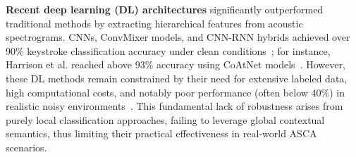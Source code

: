 \textbf{Recent deep learning (DL) architectures} significantly outperformed traditional methods by extracting hierarchical features from acoustic spectrograms. CNNs, ConvMixer models, and CNN-RNN hybrids achieved over 90\% keystroke classification accuracy under clean conditions~\cite{harrison2023practical, akinbi2023password, giallanza2019keyboard, toreini2015acoustic}; for instance, Harrison et al. reached above 93\% accuracy using CoAtNet models~\cite{harrison2023practical}. However, these DL methods remain constrained by their need for extensive labeled data, high computational costs, and notably poor performance (often below 40\%) in realistic noisy environments~\cite{giallanza2019keyboard}. This fundamental lack of robustness arises from purely local classification approaches, failing to leverage global contextual semantics, thus limiting their practical effectiveness in real-world ASCA scenarios.

